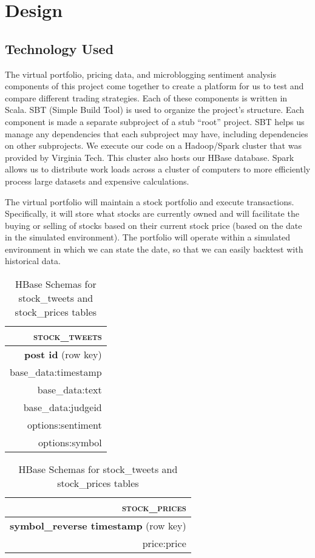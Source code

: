 
\section{Design}

\subsection{Technology Used}

The virtual portfolio, pricing data, and microblogging sentiment analysis components of this project come together to create a platform for us to test and compare different trading strategies. Each of these components is written in Scala. SBT (Simple Build Tool) is used to organize the project's structure. Each component is made a separate subproject of a stub ``root'' project. SBT helps us manage any dependencies that each subproject may have, including dependencies on other subprojects. We execute our code on a Hadoop/Spark cluster that was provided by Virginia Tech. This cluster also hosts our HBase database. Spark allows us to distribute work loads across a cluster of computers to more efficiently process large datasets and expensive calculations.

The virtual portfolio will maintain a stock portfolio and execute transactions. Specifically, it will store what stocks are currently owned and will facilitate the buying or selling of stocks based on their current stock price (based on the date in the simulated environment). The portfolio will operate within a simulated environment in which we can state the date, so that we can easily backtest with historical data.

\begin{table}
	\centering
	\begin{tabular}{ | r | }
      \hline
      \textsc{stock\_tweets} \\ \hline
      \textbf{post id} (row key) \\ \hline
      base\_data:timestamp \\\hline
      base\_data:text \\ \hline
      base\_data:judgeid \\ \hline
      options:sentiment \\ \hline
      options:symbol \\ \hline
	\end{tabular}
	\begin{tabular}{ | r | }
      \hline
      \textsc{stock\_prices} \\ \hline
      \textbf{symbol\_reverse timestamp} (row key) \\ \hline
      price:price \\ \hline
	\end{tabular}
	\caption{HBase Schemas for stock\_tweets and stock\_prices tables}\label{tab:stocks}
\end{table}

